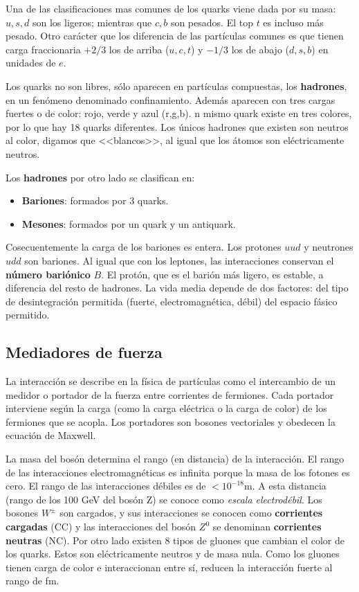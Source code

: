 Una de las clasificaciones mas comunes de los quarks viene dada por su masa: $u,s,d$ son los ligeros; mientras que $c,b$ son pesados. El top $t$ es incluso más pesado. Otro carácter que los diferencia de las partículas comunes es que tienen carga fraccionaria $+2/3$ los de arriba ($u,c,t$) y $-1/3$ los de abajo ($d,s,b$) en unidades de $e$.

Los quarks no son libres, sólo aparecen en partículas compuestas, los \textbf{hadrones}, en un fenómeno denominado confinamiento. Además aparecen con tres cargas fuertes o de color: rojo, verde y azul (r,g,b). n mismo quark existe en tres colores, por lo que hay 18 quarks diferentes. Los únicos hadrones que existen son neutros al color, digamos que <<blancos>>, al igual que los átomos son eléctricamente neutros.

Los \textbf{hadrones} por otro lado se clasifican en:

\begin{itemize}
	\item \textbf{Bariones}: formados por 3 quarks.
	\item \textbf{Mesones}: formados por un quark y un antiquark.
\end{itemize}
Cosecuentemente la carga de los bariones es entera. Los protones $uud$ y neutrones $udd$ son bariones. Al igual que con los leptones, las interacciones conservan el \textbf{número bariónico} $B$. El protón, que es el barión más ligero, es estable, a diferencia del resto de hadrones. La vida media depende de dos factores: del tipo de desintegración permitida (fuerte, electromagnética, débil) del espacio fásico permitido.

\subsection{Mediadores de fuerza}

La interacción se describe en la física de partículas como el intercambio de un medidor o portador de la fuerza entre corrientes de fermiones. Cada portador interviene según la carga (como la carga eléctrica o la carga de color) de los fermiones que se acopla. Los portadores son bosones vectoriales y obedecen la ecuación de Maxwell. 

La masa del bosón determina el rango (en distancia) de la interacción. El rango de las interacciones electromagnéticas es infinita porque la masa de los fotones es cero. El rango de las interacciones débiles es de $<10^{-18}$m. A esta distancia (rango de los 100 GeV del bosón Z) se conoce como \textit{escala electrodébil}. Los bosones $W^{\pm}$ son cargados, y sus interacciones se conocen como \textbf{corrientes cargadas} (CC) y las interacciones del bosón $Z^0$ se denominan \textbf{corrientes neutras} (NC). Por otro lado existen 8 tipos de gluones que cambian el color de los quarks. Estos son eléctricamente neutros y de masa nula. Como los gluones tienen carga de color e interaccionan entre sí, reducen la interacción fuerte al rango de fm.

